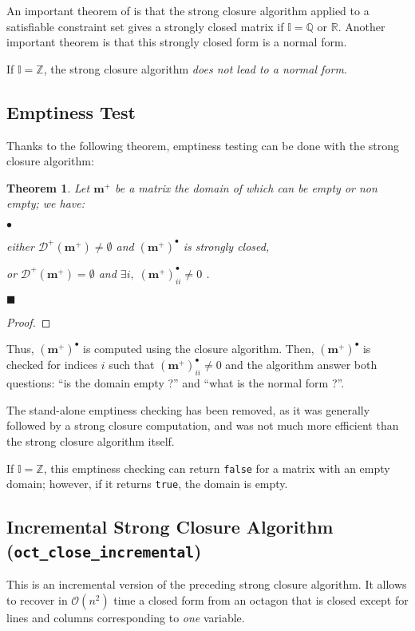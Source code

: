 \documentclass[twosides]{report}
\newenvironment{mylist}
        {\vskip-3mm\begin{list}{$\bullet$}{\setlength{\leftmargin}{.5cm}}}
        {\end{list}}
\renewcommand{\vec}[1]{{{\mathbf #1}}}
\newtheorem{theorem}{Theorem}
\newenvironment{mytheorem}
      {\vspace*{0.2cm}\par\begin{theorem}}
      {\par\vspace*{-0.2cm}\hfill$\blacksquare$\end{theorem}}
\newenvironment{myproof}
      {\begin{proof}}
      {\end{proof}}
\begin{document}
An important theorem of \cite{mine:ast01} is that the strong closure algorithm
applied to a satisfiable constraint set gives a strongly closed matrix if
$\mathbb{I}=\mathbb{Q}$ or $\mathbb{R}$.
Another important theorem is that this strongly closed form is a normal form.

If $\mathbb{I}=\mathbb{Z}$, the strong closure algorithm
{\it does not lead to a normal form}.

\subsection{Emptiness Test}

Thanks to the following theorem, emptiness testing can be done with the
strong closure algorithm:
\begin{mytheorem}
\label{emptythm}
Let $\vec{m}^+$ be a matrix the domain of which can be empty or
non empty; we have:
\begin{mylist}
\item either $\mathcal{D}^+(\vec{m}^+)\neq\emptyset$ and
$(\vec{m}^+)^\bullet$ is strongly closed,
\item or $\mathcal{D}^+(\vec{m}^+)=\emptyset$ and
$\exists i,\; (\vec{m}^+)^\bullet_{ii}\neq0$ .
\end{mylist}
\end{mytheorem}
\begin{myproof}
\end{myproof}


Thus, $(\vec{m}^+)^\bullet$ is computed using the closure algorithm.
Then, $(\vec{m}^+)^\bullet$ is checked for indices $i$ such that
$(\vec{m}^+)^\bullet_{ii}\neq0$ and the
algorithm answer both questions: ``is the domain empty ?'' and
``what is the normal form ?''.

The stand-alone emptiness checking has been removed, as it was generally 
followed by a strong closure computation, and was not much more efficient
than the strong closure algorithm itself.

If $\mathbb{I}=\mathbb{Z}$, this emptiness checking can return
{\tt false} for a matrix with an empty domain;
however, if it returns {\tt true}, the domain is empty.


\subsection{Incremental Strong Closure Algorithm ({\tt oct\_close\_incremental})}
\label{incclosure}
This is an incremental version of the preceding strong closure algorithm.
It allows to recover in $\mathcal{O}(n^2)$ time a closed form from an octagon
that is closed except for lines and columns corresponding to {\em one\/} 
variable.
\end{document}
